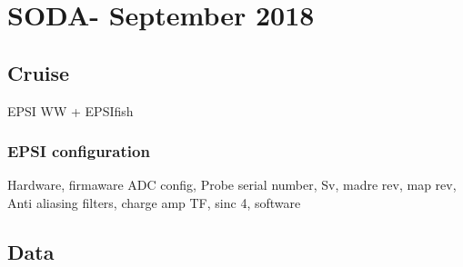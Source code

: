 \chapter{SODA- September 2018}

\section{Cruise}
EPSI WW  + EPSIfish 
\subsection{EPSI configuration}
Hardware, firmaware
ADC config, Probe serial number, Sv, madre rev, map rev, Anti aliasing filters, charge amp TF, sinc 4, software


\section{Data}

